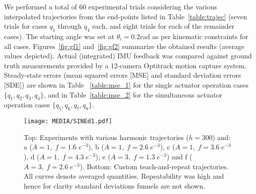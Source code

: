 \documentclass[letterpaper, 10pt, conference]{ieeeconf}      %
\begin{document}
We performed a total of 60 experimental trials considering the various interpolated trajectories from the end-points listed in Table~\ref{table:trajec} (seven trials for cases $q_1$ through $q_4$ each, and eight trials for each of the remainder cases). The starting angle was set at $\theta_i=0.2$\;rad as per kinematic constraints for all cases.  %
Figures~\ref{fig:gf1} and~\ref{fig:gf2} summarize the obtained results (average values depicted). 
%
Actual (integrated) IMU feedback was compared against ground truth measurements provided by a 12-camera Optitrack motion capture system. 
%
Steady-state errors (mean squared errors [MSE] and standard deviation errors [SDE]) are shown in Table~
\ref{table:mse_1} for the single actuator operation cases $\{q_1,q_2,q_3,q_4\}$, and in Table~\ref{table:mse_2} for the simultaneous actuator operation cases $\{q_5,q_6,q_7,q_8\}$.

\begin{figure*}[!t]
\vspace{6pt}
\centering
\texttt{[image: MEDIA/SINEd1.pdf]}
\vspace{-21pt}
\caption{Top: Experiments with various harmonic trajectories ($h=300$) and: a ($A=1,\;f=1.6\;e^{-3}$), b ($A=1,\;f=2.6 \; e^{-3}$), c ($A=1,\;f=3.6\;e^{-3}$), d ($A=1,\;f=4.3\;e^{-3}$), e ($A=3,\;f=1.3\;e^{-3}$) and f ($A=3,\;f=2.6\;e^{-3}$). Bottom: Custom teach-and-repeat trajectories. All curves denote averaged quantities. Repeatability was high and hence for clarity standard deviations funnels are not shown.}
\label{fig:siteach}
\vspace{-9pt}
\end{figure*}
\end{document}

